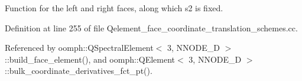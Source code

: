Function for the left and right faces, along which s2 is fixed. 



Definition at line 255 of file Qelement\+\_\+face\+\_\+coordinate\+\_\+translation\+\_\+schemes.\+cc.



Referenced by oomph\+::\+Q\+Spectral\+Element$<$ 3, N\+N\+O\+D\+E\+\_\+D $>$\+::build\+\_\+face\+\_\+element(), and oomph\+::\+Q\+Element$<$ 3, N\+N\+O\+D\+E\+\_\+D $>$\+::bulk\+\_\+coordinate\+\_\+derivatives\+\_\+fct\+\_\+pt().

